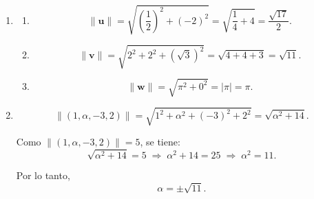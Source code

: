 \documentclass[12pt,letterpaper]{article}
\begin{document}
\begin{enumerate}
    Esto genera el sistema de ecuaciones:
    \[
    \begin{cases}
    -\alpha + 5\beta = 8 \\
    3\alpha + 5\beta = 6 \\
    2\alpha + 4\beta = 5
    \end{cases}
    \]

    Restando la primera ecuación de la segunda:
    \[
    (3\alpha + 5\beta) - (-\alpha + 5\beta) = 6 - 8 \;\Rightarrow\; 4\alpha = -2 \;\Rightarrow\; \alpha = -\frac{1}{2}.
    \]

    Sustituyendo en la primera ecuación:
    \[
    -\left(-\frac{1}{2}\right) + 5\beta = 8 \;\Rightarrow\; \frac{1}{2} + 5\beta = 8 \;\Rightarrow\; \beta = \frac{3}{2}.
    \]

    Verificamos que estos valores satisfacen la tercera ecuación:
    \[
    2\left(-\frac{1}{2}\right) + 4\left(\frac{3}{2}\right) = -1 + 6 = 5. \checkmark
    \]

    Como el sistema es consistente para las tres ecuaciones, el vector $(8,6,5)$ \textbf{sí} es combinación lineal de $(-1,3,2)$ y $(5,5,4)$:
    \[
    (8,6,5) = -\frac{1}{2}(-1,3,2) + \frac{3}{2}(5,5,4).
    \]

    \item 
    \begin{enumerate}
        \item 
        \[
        \|\mathbf{u}\| = \sqrt{\left(\frac{1}{2}\right)^2 + (-2)^2}
        = \sqrt{\frac{1}{4}+4}
        = \frac{\sqrt{17}}{2}.
        \]

        \item 
        \[
        \|\mathbf{v}\| = \sqrt{2^2+2^2+(\sqrt3)^2}
        = \sqrt{4+4+3}
        = \sqrt{11}.
        \]

        \item 
        \[
        \|\mathbf{w}\| = \sqrt{\pi^2 + 0^2} = |\pi| = \pi.
        \]
    \end{enumerate}

    \item 
    \[
    \|(1,\alpha,-3,2)\| = \sqrt{1^2+\alpha^2+(-3)^2+2^2}
    = \sqrt{\alpha^2+14}.
    \]

    Como $\|(1,\alpha,-3,2)\|=5$, se tiene:
    \[
    \sqrt{\alpha^2+14}=5 \;\Rightarrow\; \alpha^2+14=25 \;\Rightarrow\; \alpha^2=11.
    \]

    Por lo tanto,
    \[
    \alpha = \pm \sqrt{11}.
    \]
\end{enumerate}
\end{document}
